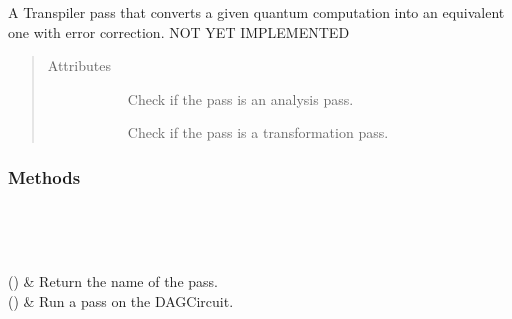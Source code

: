 \documentclass[letterpaper,10pt,english]{sphinxmanual}
\begin{document}
\begin{fulllineitems}
\label{\detokenize{Base:BaseFaultTolerance.FaultTolerance}}
A Transpiler pass that converts a given quantum computation into an equivalent one with error correction. NOT YET IMPLEMENTED
\begin{quote}\begin{description}
\item[{Attributes}] \leavevmode\begin{description}
\item[{}] \leavevmode
Check if the pass is an analysis pass.

\item[{}] \leavevmode
Check if the pass is a transformation pass.

\end{description}

\end{description}\end{quote}
\subsubsection*{Methods}


\begin{savenotes}\sphinxatlongtablestart\begin{longtable}[c]{}
\hline

\endfirsthead

%
{}\\
\hline

\endhead

\hline
{}\\
\endfoot

\endlastfoot

()
&
Return the name of the pass.
\\
\hline
{\hyperref[\detokenize{Base:BaseFaultTolerance.FaultTolerance.run}]{}}()
&
Run a pass on the DAGCircuit.
\\
\hline
\end{longtable}\sphinxatlongtableend\end{savenotes}


\end{fulllineitems}
\end{document}
